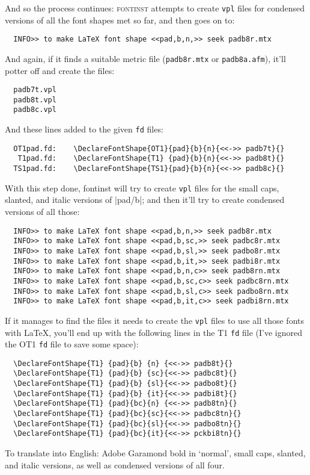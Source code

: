 \documentclass[a4paper]{ltxguide}
\newcommand*{\setfilename}[1]{\texttt{#1}}
\newcommand*{\setpackagename}[1]{\textsc{#1}}
\newcommand{\fontinst}{\setpackagename{font\-inst}\xspace}
\newcommand{\fd} {\setfilename{fd}\xspace}
\newcommand{\vpl}{\setfilename{vpl}\xspace}
\begin{document}
And so the process continues: \fontinst attempts to create \vpl files
for condensed versions of all the font shapes met so far, and then
goes on to:
\begin{verbatim}
  INFO>> to make LaTeX font shape <<pad,b,n,>> seek padb8r.mtx
\end{verbatim}
And again, if it finds a suitable metric file (\texttt{padb8r.mtx} or
\texttt{padb8a.afm}), it'll potter off and create the files:
\begin{verbatim}
  padb7t.vpl
  padb8t.vpl
  padb8c.vpl
\end{verbatim}
And these lines added to the given \fd files:
\begin{verbatim}
  OT1pad.fd:    \DeclareFontShape{OT1}{pad}{b}{n}{<<->> padb7t}{}
   T1pad.fd:    \DeclareFontShape{T1} {pad}{b}{n}{<<->> padb8t}{}
  TS1pad.fd:    \DeclareFontShape{TS1}{pad}{b}{n}{<<->> padb8c}{}
\end{verbatim}
With this step done, fontinst will try to create \vpl files for the
small caps, slanted, and italic versions of |pad/b|; and then it'll
try to create condensed versions of all those:
\begin{verbatim}
  INFO>> to make LaTeX font shape <<pad,b,n,>> seek padb8r.mtx
  INFO>> to make LaTeX font shape <<pad,b,sc,>> seek padbc8r.mtx
  INFO>> to make LaTeX font shape <<pad,b,sl,>> seek padbo8r.mtx
  INFO>> to make LaTeX font shape <<pad,b,it,>> seek padbi8r.mtx
  INFO>> to make LaTeX font shape <<pad,b,n,c>> seek padb8rn.mtx
  INFO>> to make LaTeX font shape <<pad,b,sc,c>> seek padbc8rn.mtx
  INFO>> to make LaTeX font shape <<pad,b,sl,c>> seek padbo8rn.mtx
  INFO>> to make LaTeX font shape <<pad,b,it,c>> seek padbi8rn.mtx
\end{verbatim}
If it manages to find the files it needs to create the \vpl files to
use all those fonts with \LaTeX, you'll end up with the following
lines in the T1 \fd file (I've ignored the OT1 \fd file to save some
space):
\begin{verbatim}
  \DeclareFontShape{T1} {pad}{b} {n} {<<->> padb8t}{}
  \DeclareFontShape{T1} {pad}{b} {sc}{<<->> padbc8t}{}
  \DeclareFontShape{T1} {pad}{b} {sl}{<<->> padbo8t}{}
  \DeclareFontShape{T1} {pad}{b} {it}{<<->> padbi8t}{}
  \DeclareFontShape{T1} {pad}{bc}{n} {<<->> padb8tn}{}
  \DeclareFontShape{T1} {pad}{bc}{sc}{<<->> padbc8tn}{}
  \DeclareFontShape{T1} {pad}{bc}{sl}{<<->> padbo8tn}{}
  \DeclareFontShape{T1} {pad}{bc}{it}{<<->> pckbi8tn}{}
\end{verbatim}
To translate into English: Adobe Garamond bold in `normal', small
caps, slanted, and italic versions, as well as condensed versions of
all four.
\end{document}
